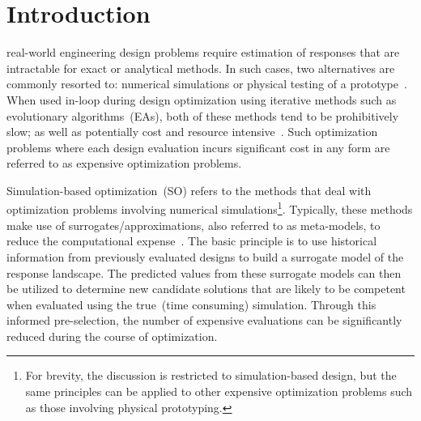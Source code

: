 \section{Introduction}
% 
% 
% 
% 

 real-world engineering design problems require estimation of responses that are intractable for exact or analytical methods. In such cases, two alternatives are commonly resorted to: numerical simulations or physical testing of a prototype~\cite{forrester2008engineering}. When used in-loop during design optimization using iterative methods such as evolutionary algorithms~(EAs), both of these methods tend to be prohibitively slow; as well as potentially cost and resource intensive~\cite{jin2009systems}. Such optimization problems where each design evaluation incurs significant cost in any form are referred to as expensive optimization problems.

Simulation-based optimization~(SO) refers to the methods that deal with optimization problems involving  numerical simulations\footnote{For brevity, the discussion is restricted to simulation-based design, but the same principles can be applied to other expensive optimization problems such as those involving physical prototyping.}. Typically, these methods make use of surrogates/approximations, also referred to as meta-models, to reduce the computational expense~\cite{amaran2016simulation}. The basic principle is to use historical information from previously evaluated designs to build a surrogate model of the response landscape. The predicted values from these surrogate models can then be utilized to determine new candidate solutions that are likely to be competent when evaluated using the true~(time consuming) simulation. Through this informed pre-selection, the number of expensive evaluations can be significantly reduced during the course of optimization. 

